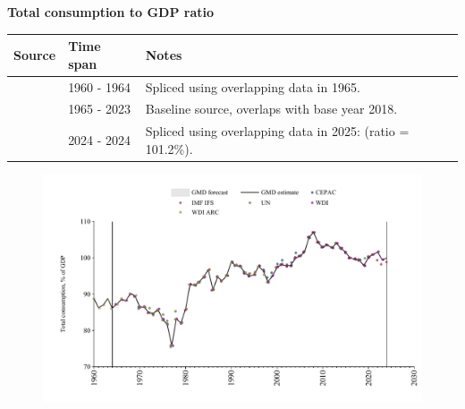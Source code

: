 \documentclass[12pt,a4paper,landscape]{article}
\begin{document}
\begin{adjustbox}{max totalsize={\paperwidth}{\paperheight},center}
\begin{minipage}[t][\textheight][t]{\textwidth}
\vspace*{0.5cm}
{}
\begin{center}
{\Large\bfseries Total consumption to GDP ratio}
\end{center}
\vspace{0.5cm}
\begin{table}[H]
\centering
\small
\begin{tabular}{|l|l|l|}
\hline
\textbf{Source} & \textbf{Time span} & \textbf{Notes} \\
\hline
\rowcolor{white}\cite{WDI_ARC}& 1960 - 1964 &Spliced using overlapping data in 1965. \\
\rowcolor{lightgray}\cite{WDI}& 1965 - 2023 &Baseline source, overlaps with base year 2018. \\
\rowcolor{white}\cite{IMF_IFS}& 2024 - 2024 &Spliced using overlapping data in 2025: (ratio = 101.2\%). \\
\hline
\end{tabular}
\end{table}
\begin{figure}[H]
\centering
\includegraphics[width=\textwidth,height=0.6\textheight,keepaspectratio]{graphs/SLV_cons_GDP.pdf}
\end{figure}
\end{minipage}
\end{adjustbox}
\end{document}
